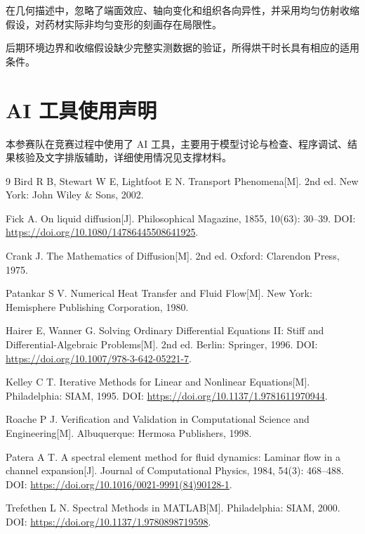 \documentclass[withoutpreface,bwprint]{cumcmthesis}
\begin{document}
在几何描述中，忽略了端面效应、轴向变化和组织各向异性，并采用均匀仿射收缩假设，对药材实际非均匀变形的刻画存在局限性。

后期环境边界和收缩假设缺少完整实测数据的验证，所得烘干时长具有相应的适用条件。

\section*{AI 工具使用声明}

本参赛队在竞赛过程中使用了 AI 工具，主要用于模型讨论与检查、程序调试、结果核验及文字排版辅助，详细使用情况见支撑材料。


\begin{thebibliography}{9}
Bird R B, Stewart W E, Lightfoot E N. Transport Phenomena[M]. 2nd ed. New York: John Wiley \& Sons, 2002.

Fick A. On liquid diffusion[J]. Philosophical Magazine, 1855, 10(63): 30--39. DOI: \url{https://doi.org/10.1080/14786445508641925}.

Crank J. The Mathematics of Diffusion[M]. 2nd ed. Oxford: Clarendon Press, 1975.

Patankar S V. Numerical Heat Transfer and Fluid Flow[M]. New York: Hemisphere Publishing Corporation, 1980.

Hairer E, Wanner G. Solving Ordinary Differential Equations II: Stiff and Differential-Algebraic Problems[M]. 2nd ed. Berlin: Springer, 1996. DOI: \url{https://doi.org/10.1007/978-3-642-05221-7}.

Kelley C T. Iterative Methods for Linear and Nonlinear Equations[M]. Philadelphia: SIAM, 1995. DOI: \url{https://doi.org/10.1137/1.9781611970944}.

Roache P J. Verification and Validation in Computational Science and Engineering[M]. Albuquerque: Hermosa Publishers, 1998.

Patera A T. A spectral element method for fluid dynamics: Laminar flow in a channel expansion[J]. Journal of Computational Physics, 1984, 54(3): 468--488. DOI: \url{https://doi.org/10.1016/0021-9991(84)90128-1}.

Trefethen L N. Spectral Methods in MATLAB[M]. Philadelphia: SIAM, 2000. DOI: \url{https://doi.org/10.1137/1.9780898719598}.
\end{thebibliography}

\clearpage
\appendix
\end{document}

